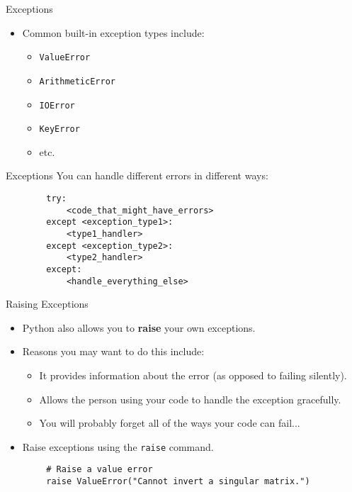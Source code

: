 \documentclass[serif,xcolor=pdftex,dvipsnames,table,hyperref={bookmarks=false,breaklinks}]{beamer}
\begin{document}
\begin{frame}[t,fragile]{Exceptions}
	\begin{itemize}[<+->]
		\item Common built-in exception types include:
		\begin{itemize}[<+->]
			\item \verb|ValueError|
			\item \verb|ArithmeticError|
			\item \verb|IOError|
			\item \verb|KeyError|
			\item etc.
		\end{itemize}
	\end{itemize}
\end{frame}

\begin{frame}[t,fragile]{Exceptions}
	You can handle different errors in different ways:
	\begin{lstlisting}
		try:
		    <code_that_might_have_errors>
		except <exception_type1>:
		    <type1_handler>
		except <exception_type2>:
		    <type2_handler>
		except:
		    <handle_everything_else>
	\end{lstlisting}
\end{frame}

\begin{frame}[t,fragile]{Raising Exceptions}
	\begin{itemize}[<+->]
		\item Python also allows you to \textbf{raise} your own exceptions.
		\item Reasons you may want to do this include:
		\begin{itemize}[<+->]
			\item It provides information about the error (as opposed to failing silently).
			\item Allows the person using your code to handle the exception gracefully.
			\item You will probably forget all of the ways your code can fail...
		\end{itemize}
		\item Raise exceptions using the \verb|raise| command.
	\end{itemize}
	\pause
	\begin{lstlisting}
		# Raise a value error
		raise ValueError("Cannot invert a singular matrix.")
	\end{lstlisting}
\end{frame}
\end{document}
